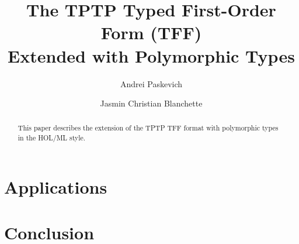 \documentclass[draft,a4paper]{llncs}
\begin{document}
\title{
The TPTP Typed First-Order Form (TFF) \\ Extended with Polymorphic Types}

\author{
Andrei Paskevich \and Jasmin Christian Blanchette
}


\maketitle

\begin{abstract}
This paper describes the extension of the TPTP TFF format with polymorphic
types in the HOL/ML style.
\end{abstract}





\section{Applications}
\section{Conclusion}



\end{document}
